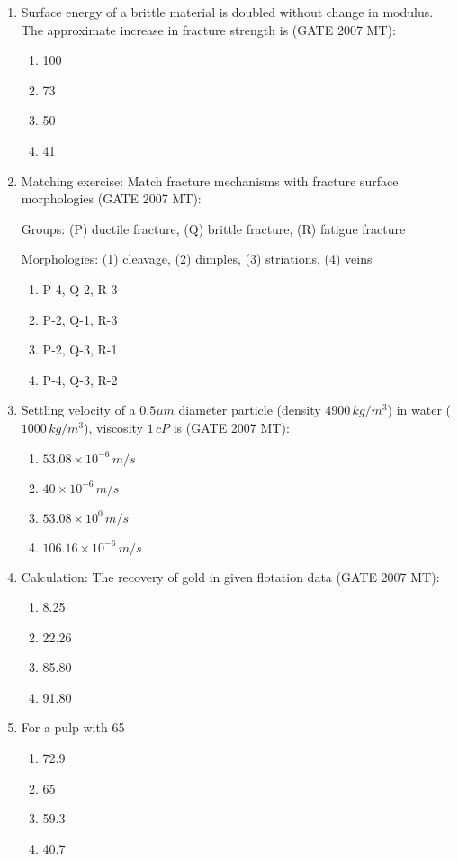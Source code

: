 \documentclass[12pt]{article}
\begin{document}
\begin{enumerate}
\item Surface energy of a brittle material is doubled without change in modulus. The approximate increase in fracture strength is (GATE 2007 MT):
\begin{enumerate}
  \item 100%
  \item 73%
  \item 50%
  \item 41%
\end{enumerate}

\item Matching exercise: Match fracture mechanisms with fracture surface morphologies (GATE 2007 MT):

Groups: (P) ductile fracture, (Q) brittle fracture, (R) fatigue fracture

Morphologies: (1) cleavage, (2) dimples, (3) striations, (4) veins

\begin{enumerate}
  \item P-4, Q-2, R-3
  \item P-2, Q-1, R-3
  \item P-2, Q-3, R-1
  \item P-4, Q-3, R-2
\end{enumerate}

\item Settling velocity of a \(0.5 \mu m\) diameter particle (density \(4900\,kg/m^3\)) in water (\(1000\,kg/m^3\)), viscosity \(1\,cP\) is (GATE 2007 MT):
\begin{enumerate}
  \item \(53.08 \times 10^{-6}\, m/s\)
  \item \(40 \times 10^{-6}\, m/s\)
  \item \(53.08 \times 10^0\, m/s\)
  \item \(106.16 \times 10^{-6}\, m/s\)
\end{enumerate}

\item Calculation: The recovery of gold in given flotation data (GATE 2007 MT):
\begin{enumerate}
  \item 8.25%
  \item 22.26%
  \item 85.80%
  \item 91.80%
\end{enumerate}

\item For a pulp with 65%
\begin{enumerate}
  \item 72.9%
  \item 65%
  \item 59.3%
  \item 40.7%
\end{enumerate}


\end{enumerate}
\end{document}
